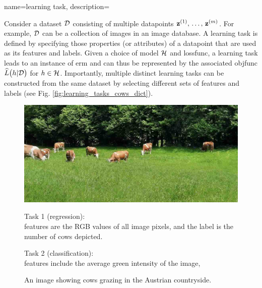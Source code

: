 {name={learning task},
	description={Consider a \gls{dataset} $\mathcal{D}$ consisting of 
		multiple \glspl{datapoint} ${\bf z}^{(1)},\,\ldots,\,{\bf z}^{(m)}$. 
		For example, $\mathcal{D}$ can be a collection of images in an image database. 
		A learning task is defined by specifying those properties (or attributes) of a \gls{datapoint} 
		that are used as its \glspl{feature} and \glspl{label}. Given a choice of \gls{model} $\mathcal{H}$ and 
		\gls{lossfunc}, a learning task leads to an instance of \gls{erm} and can thus be 
		represented by the associated \gls{objfunc} $\widehat{L}\big(h|\mathcal{D}\big)$ for $h \in \mathcal{H}$. 
		Importantly, multiple distinct learning tasks can be constructed from the same \gls{dataset} 
		by selecting different sets of \glspl{feature} and \glspl{label} (see Fig. \ref{fig:learning_tasks_cows_dict}).
    		\begin{figure}[H]
			\centering
			\begin{minipage}[t]{0.95\textwidth}
    			\centering
    			\includegraphics[width=\textwidth]{assets/CowsAustria.jpg}
    			\caption*{An image showing cows grazing in the Austrian countryside.}
			\vspace{5mm}
			\end{minipage}
			\vspace{5mm}
			\begin{minipage}[t]{0.45\textwidth}
    			Task 1 (\gls{regression}): \\
        			\Glspl{feature} are the RGB values of all image pixels,
        			and the \gls{label} is the number of cows depicted.
			\end{minipage}
			\hfill
			\begin{minipage}[t]{0.45\textwidth}
    			Task 2 (\gls{classification}): \\
			\Glspl{feature} include the average green intensity of the image, 

\end{minipage}
\end{figure}}}
